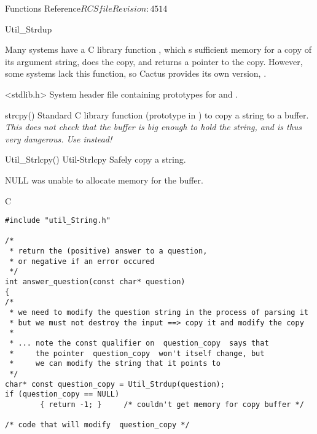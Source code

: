 \begin{cactuspart}{ Functions Reference}{$RCSfile$}{$Revision: 4514 $}
\begin{FunctionDescription}{Util\_Strdup}
\begin{Discussion}
Many systems have a C library function , which
s sufficient memory for a copy of its argument string,
does the copy, and returns a pointer to the copy.  However, some
systems lack this function, so Cactus provides its own version,
.
\end{Discussion}

\begin{SeeAlsoSection}
\begin{SeeAlso}{<stdlib.h>}
System header file containing prototypes for
 and .
\end{SeeAlso}
\begin{SeeAlso}{strcpy()}
Standard C library function (prototype in )
to copy a string to a buffer.
{\em This does not check that the buffer is big enough to hold the string,
and is thus very dangerous.  Use  instead!}
\end{SeeAlso}
\begin{SeeAlso2} {Util\_Strlcpy()} {Util-Strlcpy}
Safely copy a string.
\end{SeeAlso2}
\end{SeeAlsoSection}

\begin{ErrorSection}
\begin{Error}{NULL}
 was unable to allocate memory for the buffer.
\end{Error}
\end{ErrorSection}

\begin{ExampleSection}
\begin{Example}{C}
\begin{verbatim}
#include "util_String.h"

/*
 * return the (positive) answer to a question,
 * or negative if an error occured
 */
int answer_question(const char* question)
{
/*
 * we need to modify the question string in the process of parsing it
 * but we must not destroy the input ==> copy it and modify the copy
 *
 * ... note the const qualifier on  question_copy  says that
 *     the pointer  question_copy  won't itself change, but
 *     we can modify the string that it points to
 */
char* const question_copy = Util_Strdup(question);
if (question_copy == NULL)
        { return -1; }     /* couldn't get memory for copy buffer */

/* code that will modify  question_copy */


\end{verbatim}
\end{Example}
\end{ExampleSection}
\end{FunctionDescription}
\end{cactuspart}
